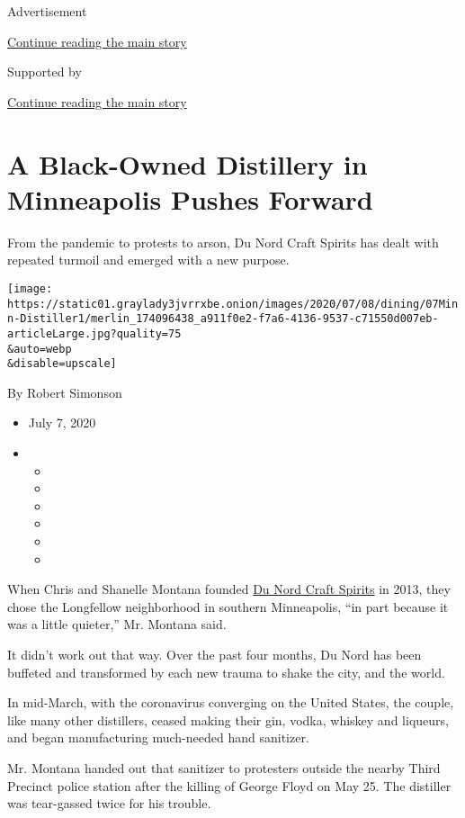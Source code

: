Advertisement

\protect\hyperlink{after-top}{Continue reading the main story}

Supported by

\protect\hyperlink{after-sponsor}{Continue reading the main story}

\hypertarget{a-black-owned-distillery-in-minneapolis-pushes-forward}{%
\section{A Black-Owned Distillery in Minneapolis Pushes
Forward}\label{a-black-owned-distillery-in-minneapolis-pushes-forward}}

From the pandemic to protests to arson, Du Nord Craft Spirits has dealt
with repeated turmoil and emerged with a new purpose.

\texttt{[image: https://static01.graylady3jvrrxbe.onion/images/2020/07/08/dining/07Minn-Distiller1/merlin\_174096438\_a911f0e2-f7a6-4136-9537-c71550d007eb-articleLarge.jpg?quality=75\\\&auto=webp\\\&disable=upscale]}

By Robert Simonson

\begin{itemize}
\item
  July 7, 2020
\item
  \begin{itemize}
  \item
  \item
  \item
  \item
  \item
  \item
  \end{itemize}
\end{itemize}

When Chris and Shanelle Montana founded
\href{http://www.dunordcraftspirits.com/}{Du Nord Craft Spirits} in
2013, they chose the Longfellow neighborhood in southern Minneapolis,
``in part because it was a little quieter,'' Mr. Montana said.

It didn't work out that way. Over the past four months, Du Nord has been
buffeted and transformed by each new trauma to shake the city, and the
world.

In mid-March, with the coronavirus converging on the United States, the
couple, like many other distillers, ceased making their gin, vodka,
whiskey and liqueurs, and began manufacturing much-needed hand
sanitizer.

Mr. Montana handed out that sanitizer to protesters outside the nearby
Third Precinct police station after the killing of George Floyd on May
25. The distiller was tear-gassed twice for his trouble.

